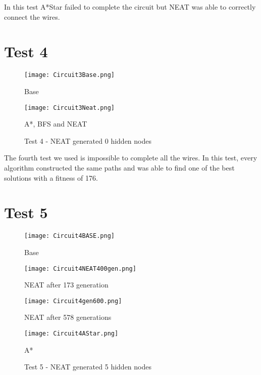 \documentclass{kththesis}
\begin{document}
In this test A*Star failed to complete the circuit but NEAT was able to correctly connect the wires.
 
 
\section{Test 4}
 
\begin{figure}[h]
{\centering
 
\begin{minipage}{0.45\textwidth}
\centering
\texttt{[image: Circuit3Base.png]}
\caption{Base}
\end{minipage}\hfill
\begin{minipage}{0.45\textwidth}
\centering
\texttt{[image: Circuit3Neat.png]}
\caption{A*, BFS and NEAT}
\end{minipage}\hfill
\caption{Test 4 - NEAT generated 0 hidden nodes}
\label{Test 4}
}
 
\end{figure}
 
The fourth test we used is impossible to complete all the wires. In this test, every algorithm constructed the same paths and was able to find one of the best solutions with a fitness of 176.

\clearpage
 
\section{Test 5}
 
\begin{figure}[h]
{\centering
 
\begin{minipage}{0.45\textwidth}
\centering
\texttt{[image: Circuit4BASE.png]}
\caption{Base}
\end{minipage}\hfill
\begin{minipage}{0.45\textwidth}
\centering
\texttt{[image: Circuit4NEAT400gen.png]}
\caption{NEAT after 173 generation}
\end{minipage}\hfill
 
\begin{minipage}{0.45\textwidth}
\centering
\texttt{[image: Circuit4gen600.png]}
\caption{NEAT after 578 generations}
\end{minipage}\hfill
\begin{minipage}{0.45\textwidth}
\centering
\texttt{[image: Circuit4AStar.png]}
\caption{A*}
\end{minipage}\hfill
\caption{Test 5 - NEAT generated 5 hidden nodes}
\label{Test 5}
}
 
\end{figure}
 
\end{document}
